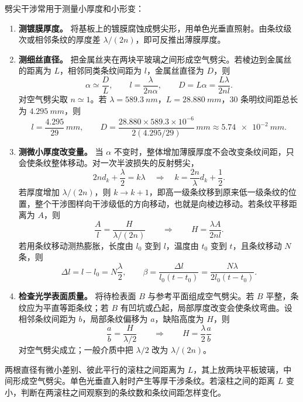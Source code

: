 \documentclass[lang=cn,11pt]{elegantbook}
\begin{document}
\begin{conclusion}[劈尖薄膜的干涉]
劈尖干涉常用于测量小厚度和小形变：
\begin{enumerate}
  \item \textbf{测镀膜厚度。} 将基板上的镀膜腐蚀成劈尖形，用单色光垂直照射。由条纹级次或相邻条纹的厚度差 \(\lambda/(2n)\)，即可反推出薄膜厚度。
  \item \textbf{测细丝直径。} 把金属丝夹在两块平玻璃之间形成空气劈尖。若棱边到金属丝的距离为 \(L\)，相邻同类条纹间距为 \(l\)，金属丝直径为 \(D\)，则
  \[
  \alpha\simeq \frac{D}{L},
  \qquad
  l=\frac{\lambda}{2n\alpha},
  \qquad
  D=L\alpha=\frac{L\lambda}{2nl}.
  \]
  对空气劈尖取 \(n\simeq1\)。若 \(\lambda=\SI{589.3}{nm}\)，\(L=\SI{28.880}{mm}\)，30 条明纹间距总长为 \(\SI{4.295}{mm}\)，则
  \[
  l=\frac{4.295}{29}\,\si{mm},
  \qquad
  D=\frac{28.880\times 589.3\times 10^{-6}}{2(4.295/29)}\,\si{mm}
  \approx \SI{5.74e-2}{mm}.
  \]
  \item \textbf{测微小厚度改变量。} 当 \(\alpha\) 不变时，整体增加薄膜厚度不会改变条纹间距，只会使条纹整体移动。对一次半波损失的反射劈尖，
  \[
  2nd_k+\frac{\lambda}{2}=k\lambda
  \quad\Longrightarrow\quad
  k=\frac{2n}{\lambda}d_k+\frac{1}{2}.
  \]
  若厚度增加 \(\lambda/(2n)\)，则 \(k\to k+1\)，即高一级条纹移到原来低一级条纹的位置，整个干涉图样向干涉级低的方向移动，也就是向棱边移动。若条纹平移距离为 \(A\)，则
  \[
  \frac{A}{l}=\frac{H}{\lambda/(2n)}
  \qquad\Longrightarrow\qquad
  H=\frac{\lambda A}{2nl}.
  \]
  若用条纹移动测热膨胀，长度由 \(l_0\) 变到 \(l\)，温度由 \(t_0\) 变到 \(t\)，且条纹移动 \(N\) 条，则
  \[
  \Delta l=l-l_0=N\frac{\lambda}{2},
  \qquad
  \beta=\frac{\Delta l}{l_0(t-t_0)}
  =\frac{N\lambda}{2l_0(t-t_0)}.
  \]
  \item \textbf{检查光学表面质量。} 将待检表面 \(B\) 与参考平面组成空气劈尖。若 \(B\) 平整，条纹应为平直等距条纹；若 \(B\) 有凹坑或凸起，局部厚度改变会使条纹弯曲。设相邻条纹间距为 \(b\)，局部条纹偏移为 \(a\)，缺陷高度为 \(H\)，则
  \[
  \frac{a}{b}=\frac{H}{\lambda/2}
  \qquad\Longrightarrow\qquad
  H=\frac{\lambda}{2}\frac{a}{b}
  \]
  对空气劈尖成立；一般介质中把 \(\lambda/2\) 改为 \(\lambda/(2n)\)。
\end{enumerate}
\end{conclusion}

\begin{exercise}
两根直径有微小差别、彼此平行的滚柱之间距离为 \(L\)，其上放两块平板玻璃，中间形成空气劈尖。单色光垂直入射时产生等厚干涉条纹。若滚柱之间的距离 \(L\) 变小，判断在两滚柱之间观察到的条纹数和条纹间距怎样变化。
\end{exercise}
\end{document}
